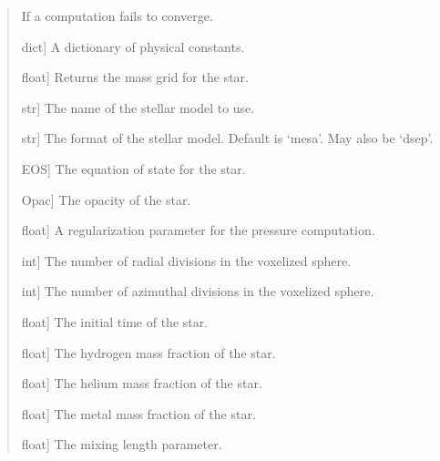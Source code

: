 \documentclass[letterpaper,10pt,english]{sphinxmanual}
\begin{document}
\begin{fulllineitems}
\begin{quote}
\begin{description}
\begin{description}
\sphinxAtStartPar
If a computation fails to converge.

\end{description}

\begin{description}
\sphinxlineitem{\sphinxstylestrong{CONST}}{[}dict{]}
\sphinxAtStartPar
A dictionary of physical constants.

\sphinxlineitem{{\hyperref[\detokenize{CoolDwarf.star:CoolDwarf.star.sphere.VoxelSphere.mass}]{\sphinxcrossref{\sphinxcode{\sphinxupquote{mass}}}}}}{[}float{]}
\sphinxAtStartPar
Returns the mass grid for the star.

\sphinxlineitem{\sphinxstylestrong{model}}{[}str{]}
\sphinxAtStartPar
The name of the stellar model to use.

\sphinxlineitem{\sphinxstylestrong{modelFormat}}{[}str{]}
\sphinxAtStartPar
The format of the stellar model. Default is ‘mesa’. May also be ‘dsep’.

\sphinxlineitem{\sphinxstylestrong{EOS}}{[}EOS{]}
\sphinxAtStartPar
The equation of state for the star.

\sphinxlineitem{\sphinxstylestrong{opac}}{[}Opac{]}
\sphinxAtStartPar
The opacity of the star.

\sphinxlineitem{\sphinxstylestrong{pressureRegularization}}{[}float{]}
\sphinxAtStartPar
A regularization parameter for the pressure computation.

\sphinxlineitem{\sphinxstylestrong{radialResolution}}{[}int{]}
\sphinxAtStartPar
The number of radial divisions in the voxelized sphere.

\sphinxlineitem{\sphinxstylestrong{azimuthalResolution}}{[}int{]}
\sphinxAtStartPar
The number of azimuthal divisions in the voxelized sphere.

\sphinxlineitem{\sphinxstylestrong{t0}}{[}float{]}
\sphinxAtStartPar
The initial time of the star.

\sphinxlineitem{\sphinxstylestrong{X}}{[}float{]}
\sphinxAtStartPar
The hydrogen mass fraction of the star.

\sphinxlineitem{\sphinxstylestrong{Y}}{[}float{]}
\sphinxAtStartPar
The helium mass fraction of the star.

\sphinxlineitem{\sphinxstylestrong{Z}}{[}float{]}
\sphinxAtStartPar
The metal mass fraction of the star.

\sphinxlineitem{\sphinxstylestrong{alpha}}{[}float{]}
\sphinxAtStartPar
The mixing length parameter.


\end{description}
\end{description}
\end{quote}
\end{fulllineitems}
\end{document}
